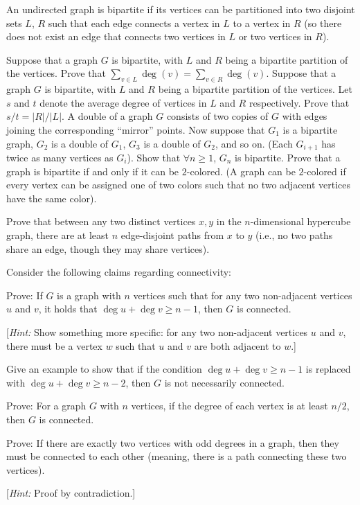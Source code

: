 
An undirected graph is bipartite if its vertices can be partitioned into two disjoint sets $L$, $R$ such that each edge connects a vertex in $L$ to a vertex in $R$ (so there does not exist an edge that connects two vertices in $L$ or two vertices in $R$).

\begin{Parts}
    \Part 	
	Suppose that a graph $G$ is bipartite, with $L$ and $R$ being a bipartite partition of the vertices. Prove that $\sum\limits_{v \in L} \deg(v) = \sum\limits_{v \in R} \deg(v)$.
	\Part
	Suppose that a graph $G$ is bipartite, with $L$ and $R$ being a bipartite partition of the vertices. Let $s$ and $t$ denote the average degree of vertices in $L$ and $R$ respectively. Prove that $s/t = |R|/|L|$.
	\Part
    A double of a graph $G$ consists of two copies of $G$ with edges joining
    the corresponding ``mirror'' points. Now suppose that $G_1$ is a bipartite
    graph, $G_2$ is a double of $G_1$, $G_3$ is a double of $G_2$, and so on. (Each $G_{i+1}$ has twice as many vertices as $G_i$).
    Show that $\forall n \geq 1$, $G_n$ is bipartite.
    \Part
    Prove that a graph is bipartite if and only if it can be $2$-colored. (A graph can be $2$-colored if every vertex can be assigned one of two colors such that no two adjacent vertices have the same color).

\end{Parts}



Prove that between any two distinct vertices $x,y$ in the $n$-dimensional hypercube graph, there are at least $n$ edge-disjoint paths from $x$ to $y$ (i.e., no two paths share an edge, though they may share vertices).



Consider the following claims regarding connectivity:
\begin{Parts}
    \Part  Prove: If $G$ is a graph with $n$ vertices such that for any two non-adjacent vertices $u$ and $v$, it holds that $\deg u + \deg v \ge n - 1$, then $G$ is connected. 
    
    [\textit{Hint:} Show something more specific: for any two non-adjacent vertices $u$ and $v$, there must be a vertex $w$ such that $u$ and $v$ are both adjacent to $w$.]

    \Part  Give an example to show that if the condition $\deg u + \deg v \ge n - 1$ is replaced with $\deg u + \deg v \ge n - 2$, then $G$ is not necessarily connected.

    \Part Prove: For a graph $G$ with $n$ vertices, if the degree of each vertex is at least $n/2$, then $G$ is connected. 
    
    \Part Prove: If there are exactly two vertices with odd degrees in a graph, then they must be connected to each other (meaning, there is a path connecting these two vertices). 
    
    [\textit{Hint:} Proof by contradiction.]
\end{Parts}


